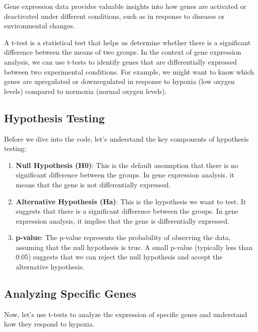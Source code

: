 \documentclass[
]{book}
\begin{document}
Gene expression data provides valuable insights into how genes are activated or deactivated under different conditions, such as in response to diseases or environmental changes.

A t-test is a statistical test that helps us determine whether there is a significant difference between the means of two groups. In the context of gene expression analysis, we can use t-tests to identify genes that are differentially expressed between two experimental conditions. For example, we might want to know which genes are upregulated or downregulated in response to hypoxia (low oxygen levels) compared to normoxia (normal oxygen levels).

\hypertarget{hypothesis-testing-1}{%
\subsection{Hypothesis Testing}\label{hypothesis-testing-1}}

Before we dive into the code, let's understand the key components of hypothesis testing:

\begin{enumerate}
\def\labelenumi{\arabic{enumi}.}
\item
  \textbf{Null Hypothesis (H0)}: This is the default assumption that there is no significant difference between the groups. In gene expression analysis, it means that the gene is not differentially expressed.
\item
  \textbf{Alternative Hypothesis (Ha)}: This is the hypothesis we want to test. It suggests that there is a significant difference between the groups. In gene expression analysis, it implies that the gene is differentially expressed.
\item
  \textbf{p-value}: The p-value represents the probability of observing the data, assuming that the null hypothesis is true. A small p-value (typically less than 0.05) suggests that we can reject the null hypothesis and accept the alternative hypothesis.
\end{enumerate}

\hypertarget{analyzing-specific-genes}{%
\subsection{Analyzing Specific Genes}\label{analyzing-specific-genes}}

Now, let's use t-tests to analyze the expression of specific genes and understand how they respond to hypoxia.
\end{document}
